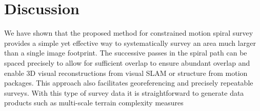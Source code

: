 \section{Discussion}
We have shown that the proposed method for constrained motion spiral survey provides a simple yet effective way to systematically survey an area much larger than a single image footprint. The successive passes in the spiral path can be spaced precisely to allow for sufficient overlap to ensure abundant overlap and enable 3D visual reconstructions from visual SLAM or structure from motion packages. This approach also facilitates georeferencing and precisely repeatable surveys. With this type of survey data it is straightforward to generate data products such as multi-scale terrain complexity measures \cite{Friedman_2012}

